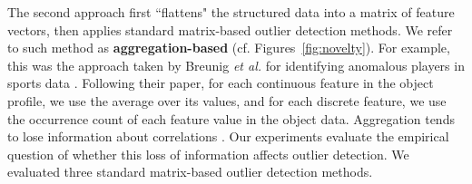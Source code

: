 \documentclass[conference]{IEEEtran}
\begin{document}
						The second approach first ``flattens" the structured data into a matrix of feature vectors, then applies standard matrix-based outlier detection methods. We refer to such method as \textbf{aggregation-based}
						(cf. Figures~\ref{fig:novelty}). For example, this was the approach taken by Breunig {\em et al.} for identifying anomalous players in sports data \cite{Breunig2000}. Following their paper, for each continuous feature in the object profile, we use the average over its values, and for each discrete feature, we use the occurrence count of each feature value in the object data. Aggregation 
						tends to lose information about correlations .
Our experiments evaluate the empirical question of whether this loss of information affects outlier detection. 
						We evaluated three standard matrix-based outlier detection methods.

						
						
						
						
						
%						
%						
%						
						
\end{document}
